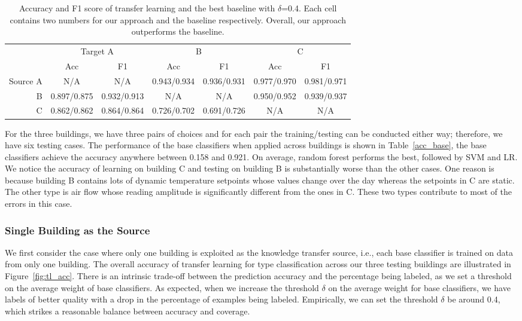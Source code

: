 \begin{table}[]
\centering
\begin{tabular}{r|c|c|c|c|c|c}
\hline
\multirow{2}{*}{} & \multicolumn{2}{c|}{Target A} & \multicolumn{2}{c|}{B} & \multicolumn{2}{c}{C} \\ \cline{2-7} 
                  & Acc        & F1        & Acc        & F1        & Acc        & F1        \\ \hline
Source A                 & N/A      & N/A     & 0.943/0.934      & 0.936/0.931     & 0.977/0.970      & 0.981/0.971     \\ \hline
B                 & 0.897/0.875     & 0.932/0.913     & N/A      & N/A     & 0.950/0.952      & 0.939/0.937     \\ \hline
C                 & 0.862/0.862     & 0.864/0.864     & 0.726/0.702      & 0.691/0.726     & N/A     & N/A     \\ \hline
\end{tabular}
\caption{Accuracy and F1 score of transfer learning and the best baseline with $\delta$=0.4. Each cell contains two numbers for our approach and the baseline respectively. Overall, our approach outperforms the baseline.}
\label{table:f1}
\end{table}

For the three buildings, we have three pairs of choices and for each pair the training/testing can be conducted either way; therefore, we have six testing cases.
The performance of the base classifiers when applied across buildings is shown in Table~\ref{acc_base}, the base classifiers achieve the accuracy anywhere between 0.158 and 0.921.
On average, random forest performs the best, followed by SVM and LR. 
We notice the accuracy of learning on building C and testing on building B is substantially worse than the other cases. 
One reason is because building B contains lots of dynamic temperature setpoints whose values change over the day whereas the setpoints in C are static. The other type is air flow whose reading amplitude is significantly different from the ones in C. These two types contribute to most of the errors in this case.


\subsubsection{Single Building as the Source}
We first consider the case where only one building is exploited as the knowledge transfer source, i.e., each base classifier is trained on data from only one building. 
The overall accuracy of transfer learning for type classification across our three testing buildings are illustrated in Figure~\ref{fig:tl_acc}.
There is an intrinsic trade-off between the prediction accuracy and the percentage being labeled, as we set a threshold on the average weight of base classifiers. 
As expected, when we increase the threshold $\delta$ on the average weight for base classifiers, we have labels of better quality with a drop in the percentage of examples being labeled. 
Empirically, we can set the threshold $\delta$ be around 0.4, which strikes a reasonable balance between accuracy and coverage.

